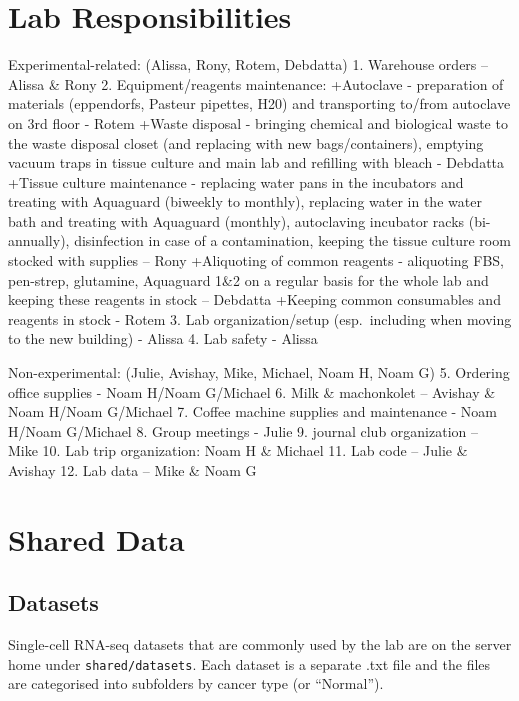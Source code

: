 \documentclass[
]{book}
\begin{document}
\hypertarget{labResponsibilities}{%
\chapter{Lab Responsibilities}\label{labResponsibilities}}

Experimental-related:
(Alissa, Rony, Rotem, Debdatta)
1. Warehouse orders -- Alissa \& Rony
2. Equipment/reagents maintenance:
+Autoclave - preparation of materials (eppendorfs, Pasteur pipettes, H20) and transporting to/from autoclave on 3rd floor - Rotem
+Waste disposal - bringing chemical and biological waste to the waste disposal closet (and replacing with new bags/containers), emptying vacuum traps in tissue culture and main lab and refilling with bleach - Debdatta
+Tissue culture maintenance - replacing water pans in the incubators and treating with Aquaguard (biweekly to monthly), replacing water in the water bath and treating with Aquaguard (monthly), autoclaving incubator racks (bi-annually), disinfection in case of a contamination, keeping the tissue culture room stocked with supplies -- Rony
+Aliquoting of common reagents - aliquoting FBS, pen-strep, glutamine, Aquaguard 1\&2 on a regular basis for the whole lab and keeping these reagents in stock -- Debdatta
+Keeping common consumables and reagents in stock - Rotem
3. Lab organization/setup (esp.~including when moving to the new building) - Alissa
4. Lab safety - Alissa

Non-experimental:
(Julie, Avishay, Mike, Michael, Noam H, Noam G)
5. Ordering office supplies - Noam H/Noam G/Michael
6. Milk \& machonkolet -- Avishay \& Noam H/Noam G/Michael
7. Coffee machine supplies and maintenance - Noam H/Noam G/Michael
8. Group meetings - Julie
9. journal club organization -- Mike
10. Lab trip organization: Noam H \& Michael
11. Lab code -- Julie \& Avishay
12. Lab data -- Mike \& Noam G

\hypertarget{sharedData}{%
\chapter{Shared Data}\label{sharedData}}

\hypertarget{datasets}{%
\section{Datasets}\label{datasets}}

Single-cell RNA-seq datasets that are commonly used by the lab are on the server home under \texttt{shared/datasets}. Each dataset is a separate .txt file and the files are categorised into subfolders by cancer type (or ``Normal'').
\end{document}
